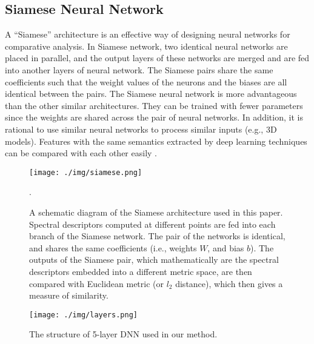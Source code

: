 \documentclass[5p,twocolumn,10pt,times]{elsarticle}
\begin{document}
\subsection{Siamese Neural Network}
\label{network}
A ``Siamese'' architecture \cite{bromley1993signature} is an effective way of designing neural networks for comparative analysis. In Siamese network, two identical neural networks are placed in parallel, and the output layers of these networks are merged and are fed into another layers of neural network. The Siamese pairs share the same coefficients such that the weight values of the neurons and the biases are all identical between the pairs. The Siamese neural network is more advantageous than the other similar architectures. They can be trained with fewer parameters since the weights are shared across the pair of neural networks. In addition, it is rational to use similar neural networks to process similar inputs (e.g., 3D models). Features with the same semantics extracted by deep learning techniques can be compared with each other easily \cite{koch2015siamese}.

\begin{figure*}
	\begin{center}
			\texttt{[image: ./img/siamese.png]}
	\end{center}
	\caption{A schematic diagram of the Siamese architecture used in this paper. Spectral descriptors computed at different points are fed into each branch of the Siamese network. The pair of the networks is identical, and shares the same coefficients (i.e., weights $W$, and bias $b$). The outputs of the Siamese pair, which mathematically are the spectral descriptors embedded into a different metric space, are then compared with Euclidean metric (or $l_2$ distance), which then gives a measure of similarity.}.
	\label{fig:siamese}
\end{figure*}


\begin{figure}
	\begin{center}
			\texttt{[image: ./img/layers.png]}
	\end{center}
	\caption{The structure of 5-layer DNN used in our method.}
	\label{fig:layers}
\end{figure}
\end{document}
